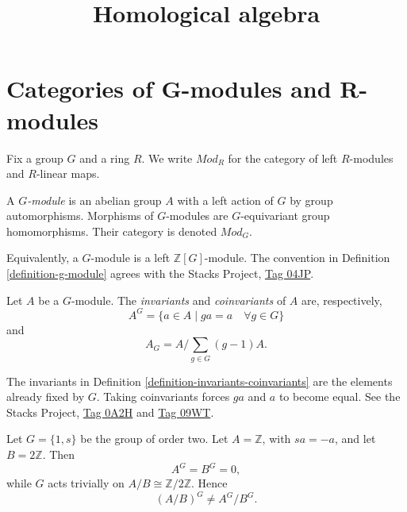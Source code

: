 



\title{Homological algebra}
\maketitle

\label{section-phantom}

\tableofcontents

\section{Categories of G-modules and
R-modules}
\label{section-g-and-r-modules}

\noindent
Fix a group $G$ and a ring $R$. We write
$\mathit{Mod}_R$ for the category of left
$R$-modules and $R$-linear maps.

\begin{definition}
\label{definition-g-module}
A {\it $G$-module} is an abelian group $A$
with a left action of $G$ by group
automorphisms. Morphisms of $G$-modules are
$G$-equivariant group homomorphisms. Their
category is denoted $\mathit{Mod}_G$.
\end{definition}

\noindent
Equivalently, a $G$-module is a left
$\mathbb{Z}[G]$-module. The convention in
Definition \ref{definition-g-module} agrees
with the Stacks Project,
\href{https://stacks.math.columbia.edu/tag/%
04JP}{Tag 04JP}.

\begin{definition}
\label{definition-invariants-coinvariants}
Let $A$ be a $G$-module. The {\it
invariants} and {\it coinvariants} of $A$
are, respectively,
$$
A^G
=
\{a\in A\mid ga=a\quad\forall g\in G\}
$$
and
$$
A_G
=
A\Big/\sum_{g\in G}(g-1)A.
$$
\end{definition}

\noindent
The invariants in Definition
\ref{definition-invariants-coinvariants}
are the elements already fixed by $G$.
Taking coinvariants forces $ga$ and $a$
to become equal. See the
Stacks Project,
\href{https://stacks.math.columbia.edu/tag/%
0A2H}{Tag 0A2H} and
\href{https://stacks.math.columbia.edu/tag/%
09WT}{Tag 09WT}.

\begin{example}
\label{example-invariants-quotient}
Let $G=\{1,s\}$ be the group of order two.
Let $A=\mathbb{Z}$, with $sa=-a$, and let
$B=2\mathbb{Z}$. Then
$$
A^G=B^G=0,
$$
while $G$ acts trivially on
$A/B\cong\mathbb{Z}/2\mathbb{Z}$. Hence
$$
(A/B)^G\ne A^G/B^G.
$$
\end{example}

